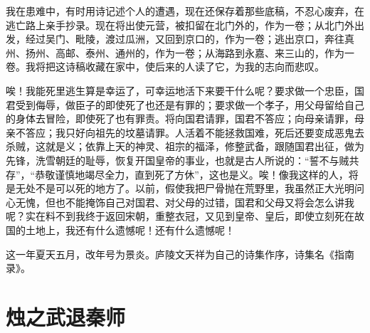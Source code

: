 \documentclass[12pt,UTF-8,openany]{ctexbook}
\begin{document}
\begin{normalsize}
    我在患难中，有时用诗记述个人的遭遇，现在还保存着那些底稿，不忍心废弃，在逃亡路上亲手抄录。现在将出使元营，被扣留在北门外的，作为一卷；从北门外出发，经过吴门、毗陵，渡过瓜洲，又回到京口的，作为一卷；逃出京口，奔往真州、扬州、高邮、泰州、通州的，作为一卷；从海路到永嘉、来三山的，作为一卷。我将把这诗稿收藏在家中，使后来的人读了它，为我的志向而悲叹。
    
    唉！我能死里逃生算是幸运了，可幸运地活下来要干什么呢？要求做一个忠臣，国君受到侮辱，做臣子的即使死了也还是有罪的；要求做一个孝子，用父母留给自己的身体去冒险，即使死了也有罪责。将向国君请罪，国君不答应；向母亲请罪，母亲不答应；我只好向祖先的坟墓请罪。人活着不能拯救国难，死后还要变成恶鬼去杀贼，这就是义；依靠上天的神灵、祖宗的福泽，修整武备，跟随国君出征，做为先锋，洗雪朝廷的耻辱，恢复开国皇帝的事业，也就是古人所说的：“誓不与贼共存”，“恭敬谨慎地竭尽全力，直到死了方休”，这也是义。唉！像我这样的人，将是无处不是可以死的地方了。以前，假使我把尸骨抛在荒野里，我虽然正大光明问心无愧，但也不能掩饰自己对国君、对父母的过错，国君和父母又将会怎么讲我呢？实在料不到我终于返回宋朝，重整衣冠，又见到皇帝、皇后，即使立刻死在故国的土地上，我还有什么遗憾呢！还有什么遗憾呢！
    
    这一年夏天五月，改年号为景炎。庐陵文天祥为自己的诗集作序，诗集名《指南录》。
    
\end{normalsize}



\chapter{烛之武退秦师}
\end{document}
